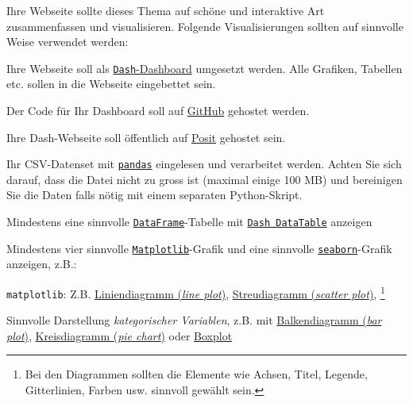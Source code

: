Ihre Webseite sollte dieses Thema auf schöne und interaktive Art zusammenfassen und visualisieren. Folgende Visualisierungen sollten auf sinnvolle Weise verwendet werden:
\begin{todolist}
    \item Ihre Webseite soll als \href{https://dash.plotly.com/tutorial}{\texttt{Dash}-Dashboard} umgesetzt werden. Alle Grafiken, Tabellen etc. sollen in die Webseite eingebettet sein.
    \item Der Code für Ihr Dashboard soll auf \href{https://github.com}{GitHub} gehostet werden.
    \item Ihre Dash-Webseite soll öffentlich auf \href{https://posit.co/blog/deploying-a-dash-application-to-posit-connect/}{Posit} gehostet sein.
    \item Ihr CSV-Datenset mit \href{https://pandas.pydata.org/docs/reference/api/pandas.read_csv.html}{\texttt{pandas}} eingelesen und verarbeitet werden. Achten Sie sich darauf, dass die Datei nicht zu gross ist (maximal einige 100 MB) und bereinigen Sie die Daten falls nötig mit einem separaten Python-Skript.
    \item Mindestens eine sinnvolle \href{https://pandas.pydata.org/docs/reference/api/pandas.DataFrame.html}{\texttt{DataFrame}}-Tabelle mit \href{https://dash.plotly.com/datatable}{\texttt{Dash DataTable}} anzeigen
    \item Mindestens vier sinnvolle \href{https://matplotlib.org/stable/tutorials/pyplot.html#sphx-glr-tutorials-pyplot-py}{\texttt{Matplotlib}}-Grafik und eine sinnvolle \href{https://seaborn.pydata.org/generated/seaborn.scatterplot.html}{\texttt{seaborn}}-Grafik anzeigen, z.B.:
    \begin{todolist}
        \item \texttt{matplotlib}: Z.B. \href{https://matplotlib.org/stable/tutorials/pyplot.html#sphx-glr-tutorials-pyplot-py}{Liniendiagramm (\textit{line plot})}, \href{https://matplotlib.org/stable/tutorials/pyplot.html#sphx-glr-tutorials-pyplot-py}{Streudiagramm (\textit{scatter plot})}, \footnote{Bei den Diagrammen sollten die Elemente wie Achsen, Titel, Legende, Gitterlinien, Farben usw. sinnvoll gewählt sein.}
        \item Sinnvolle Darstellung \textit{kategorischer Variablen}, z.B. mit \href{https://matplotlib.org/stable/tutorials/pyplot.html#sphx-glr-tutorials-pyplot-py}{Balkendiagramm (\textit{bar plot})}, \href{https://matplotlib.org/stable/tutorials/pyplot.html#sphx-glr-tutorials-pyplot-py}{Kreisdiagramm (\textit{pie chart})} oder \href{https://seaborn.pydata.org/generated/seaborn.boxplot.html}{Boxplot}

\end{todolist}
\end{todolist}

